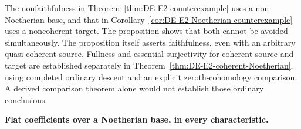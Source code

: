 \begin{remark}\label{rem:DE-E2-coherent-faithfulness-scope}
The nonfaithfulness in Theorem~\ref{thm:DE-E2-counterexample} uses a non-Noetherian base, and that in Corollary~\ref{cor:DE-E2-Noetherian-counterexample} uses a noncoherent target.  The proposition shows that both cannot be avoided simultaneously.  The proposition itself asserts faithfulness, even with an arbitrary quasi-coherent source.  Fullness and essential surjectivity for coherent source and target are established separately in Theorem~\ref{thm:DE-E2-coherent-Noetherian}, using completed ordinary descent and an explicit zeroth-cohomology comparison.  A derived comparison theorem alone would not establish those ordinary conclusions.
\end{remark}

\par\smallskip\noindent\textbf{Flat coefficients over a Noetherian base, in every characteristic.}

